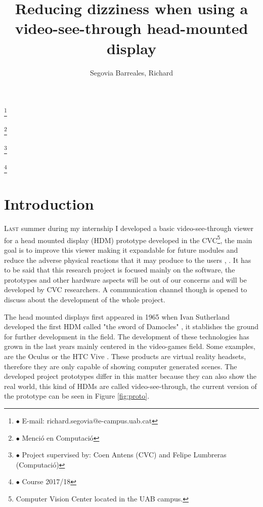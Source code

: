 \documentclass[10pt,a4paper,twocolumn,twoside]{article}
\author{\LARGE\sffamily Segovia Barreales, Richard}
\title{\Huge{\sffamily Reducing dizziness when using a video-see-through head-mounted display}}
\date{}
\newcommand\blfootnote[1]{%
	\begingroup
	\renewcommand\thefootnote{}\footnote{#1}%
	\addtocounter{footnote}{-1}%
	\endgroup
}
\begin{document}
	
	\fancyhead[RO]{\thepage}
	\fancyhead[LE]{\thepage}
	
	\fancyfoot[CO,CE]{}
	
	{
		\fancyhf{}
	}
	
	\renewcommand{\headrulewidth}{0pt}
	\renewcommand{\footrulewidth}{0pt}
	\pagestyle{fancy}
	
	\maketitle
	
	\thispagestyle{primerapagina}
	
	
	\blfootnote{$\bullet$ E-mail: richard.segovia@e-campus.uab.cat}
	\blfootnote{$\bullet$ Menció en Computació}
	\blfootnote{$\bullet$ Project supervised by: Coen Antens (CVC) and Felipe Lumbreras (Computació)}
	\blfootnote{$\bullet$ Course 2017/18}
	
	\section{Introduction}
	
	\lettrine[lines=3]{L}{ast} summer during my internship I developed a basic video-see-through viewer for a head mounted display (HDM) prototype developed in the CVC\footnote{Computer Vision Center located in the UAB campus.}, the main goal is to improve this viewer making it expandable for future modules and reduce the adverse physical reactions that it may produce to the users \cite{disconfortReview}, \cite{unpublishCVC}. It has to be said that this research project is focused mainly on the software, the prototypes and other hardware aspects will be out of our concerns and will be developed by CVC researchers. A communication channel though is opened to discuss about the development of the whole project.
	
	The head mounted displays first appeared in 1965 when Ivan Sutherland developed the first HDM called "the sword of Damocles" \cite{hdmSutherland}, it stablishes the ground for further development in the field. The development of these technologies has grown in the last years mainly centered in the video-games field. Some examples, are the Oculus \cite{web:oculus} or the HTC Vive \cite{web:vive}. These products are virtual reality headsets, therefore they are only capable of showing computer generated scenes. The developed project prototypes differ in this matter because they can also show the real world, this kind of HDMs are called video-see-through, the current version of the prototype can be seen in Figure \ref{fig:proto}. %
	
\end{document}
